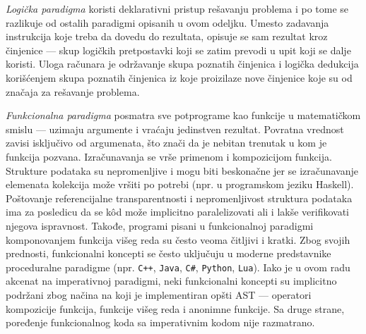 \emph{Logička paradigma} koristi deklarativni pristup rešavanju problema i po tome se razlikuje od ostalih paradigmi opisanih u ovom odeljku. Umesto zadavanja instrukcija koje treba da dovedu do rezultata, opisuje se sam rezultat kroz činjenice --- skup logičkih pretpostavki koji se zatim prevodi u upit koji se dalje koristi. Uloga računara je održavanje skupa poznatih činjenica i logička dedukcija korišćenjem skupa poznatih činjenica iz koje proizilaze nove činjenice koje su od značaja za rešavanje problema. 

\emph{Funkcionalna paradigma} posmatra sve potprograme kao funkcije u matematičkom smislu --- uzimaju argumente i vraćaju jedinstven rezultat. Povratna vrednost zavisi isključivo od argumenata, što znači da je nebitan trenutak u kom je funkcija pozvana. Izračunavanja se vrše primenom i kompozicijom funkcija. Strukture podataka su nepromenljive i mogu biti beskonačne jer se izračunavanje elemenata kolekcija može vršiti po potrebi (npr. u programskom jeziku Haskell). Poštovanje referencijalne transparentnosti i nepromenljivost struktura podataka ima za posledicu da se k\^od može implicitno paralelizovati ali i lakše verifikovati njegova ispravnost. Takođe, programi pisani u funkcionalnoj paradigmi komponovanjem funkcija višeg reda su često veoma čitljivi i kratki. Zbog svojih prednosti, funkcionalni koncepti se često uključuju u moderne predstavnike proceduralne paradigme (npr. \texttt{C++}, \texttt{Java}, \texttt{C\#}, \texttt{Python}, \texttt{Lua}). Iako je u ovom radu akcenat na imperativnoj paradigmi, neki funkcionalni koncepti su implicitno podržani zbog načina na koji je implementiran opšti AST --- operatori kompozicije funkcija, funkcije višeg reda i anonimne funkcije. Sa druge strane, poređenje funkcionalnog koda sa imperativnim kodom nije razmatrano. 
